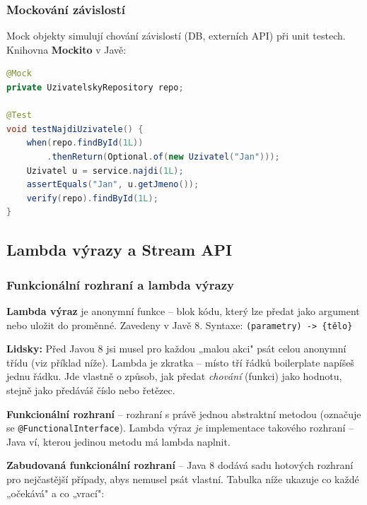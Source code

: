 \subsubsection{Mockování závislostí}

Mock objekty simulují chování závislostí (DB, externích API) při unit testech.
Knihovna \textbf{Mockito} v Javě:
\begin{lstlisting}[language=Java, caption=Mockování s Mockito]
@Mock
private UzivatelskyRepository repo;

@Test
void testNajdiUzivatele() {
    when(repo.findById(1L))
        .thenReturn(Optional.of(new Uzivatel("Jan")));
    Uzivatel u = service.najdi(1L);
    assertEquals("Jan", u.getJmeno());
    verify(repo).findById(1L);
}
\end{lstlisting}

\subsection{Lambda výrazy a Stream API}

\subsubsection{Funkcionální rozhraní a lambda výrazy}

\textbf{Lambda výraz} je anonymní funkce -- blok kódu, který lze předat jako argument nebo uložit do proměnné.
Zavedeny v Javě 8. Syntaxe: \texttt{(parametry) -> \{tělo\}}

\textbf{Lidsky:} Před Javou 8 jsi musel pro každou „malou akci" psát celou anonymní třídu (viz příklad níže).
Lambda je zkratka -- místo tří řádků boilerplate napíšeš jednu řádku. Jde vlastně o způsob, jak předat
\textit{chování} (funkci) jako hodnotu, stejně jako předáváš číslo nebo řetězec.

\textbf{Funkcionální rozhraní} -- rozhraní s právě jednou abstraktní metodou (označuje se \texttt{@FunctionalInterface}).
Lambda výraz \textit{je} implementace takového rozhraní -- Java ví, kterou jedinou metodu má lambda naplnit.

\textbf{Zabudovaná funkcionální rozhraní} -- Java 8 dodává sadu hotových rozhraní pro nejčastější případy,
abys nemusel psát vlastní. Tabulka níže ukazuje co každé „očekává" a co „vrací":

